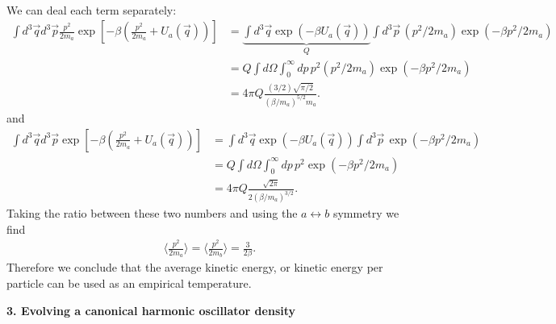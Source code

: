 \documentclass{article}
\theoremstyle{definition}
\newcommand{\be}{\beta}
\newcommand{\f}[2]{\frac{#1}{#2}}
\newcommand{\lp}{\left(}
\newcommand{\rp}{\right)}
\newcommand{\lb}{\left[}
\newcommand{\rb}{\right]}
\begin{document}
\begin{enumerate}[label=(\alph*)]
\begin{align*}
	\end{align*}
	We can deal each term separately:
	\begin{align*}
	 \int d^3 \vec{q}  d^3\vec{p} \f{p^2}{2m_a} \exp\lb -\be \lp \f{p^2}{2m_a} + U_a(\vec{q}) \rp \rb 
	 &=  \underbrace{\int d^3 \vec{q} \exp(-\be U_a(\vec{q}))}_{Q} \int  d^3\vec{p}\,  (p^2/2m_a) \exp(-\be p^2/2m_a)\\
	 &= Q \int d\Omega \int_0^\infty dp \, p^2 (p^2/2m_a)\exp(-\be p^2/2m_a) \\
	 &= 4\pi Q \f{(3/2)\sqrt{\pi/2}}{(\be/m_a)^{5/2}m_a}.
	\end{align*}
	and 
	\begin{align*}
	\int d^3 \vec{q}  d^3\vec{p} \exp\lb -\be \lp \f{p^2}{2m_a} + U_a(\vec{q}) \rp \rb 
	&=  \int d^3 \vec{q} \exp(-\be U_a(\vec{q})) \int  d^3\vec{p}\, \exp(-\be p^2/2m_a)\\
	&=  Q \int d\Omega \int_0^\infty dp\,p^2 \exp(-\be p^2/2m_a) \\
	&= 4\pi Q \f{\sqrt{2\pi}}{2(\be/m_a)^{3/2}}.
	\end{align*}
	Taking the ratio between these two numbers and using the $a\leftrightarrow b$ symmetry we find 
	\begin{align*}
	\langle \f{p^2}{2m_a} \rangle = \langle \f{p^2}{2m_b}\rangle  = \f{3}{2\be}.
	\end{align*}
	Therefore we conclude that the average kinetic energy, or kinetic energy per particle can be used as an empirical temperature. 
	
	
	
	
	
\end{enumerate}

\noindent \textbf{3. Evolving a canonical harmonic oscillator density}
\end{document}
